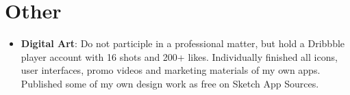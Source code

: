 \documentclass[letterpaper,11pt]{article}
\newcommand{\resumeSubHeadingListStart}{\begin{itemize}[leftmargin=*]}
\newcommand{\resumeSubHeadingListEnd}{\end{itemize}}
\begin{document}
\section{Other}
  \resumeSubHeadingListStart
    \item{
      \textbf{Digital Art}{: Do not participle in a professional matter, but hold a Dribbble player account with 16 shots and 200+ likes. Individually finished all icons, user interfaces, promo videos and marketing materials of my own apps. Published some of my own design work as free on Sketch App Sources.}
    }
  \resumeSubHeadingListEnd

\end{document}
